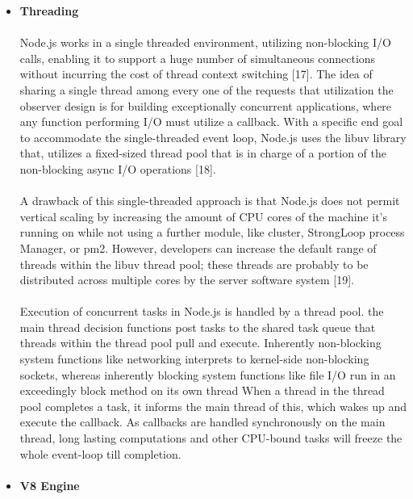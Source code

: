 \documentclass[../thesis.tex]{subfiles}
\begin{document}
\begin{itemize}
    \item \textbf{Threading}
    \paragraph{}
    Node.js works in a single threaded environment, utilizing non-blocking I/O calls, enabling it to support a huge number of simultaneous connections without incurring the cost of thread context switching [17]. The idea of sharing a single thread among every one of the requests that utilization the observer design is for building exceptionally concurrent applications, where any function performing I/O must utilize a callback. With a specific end goal to accommodate the single-threaded event loop, Node.js uses the libuv library that, utilizes a fixed-sized thread pool that is in charge of a portion of the non-blocking async I/O operations [18].
    \paragraph{}
    A drawback of this single-threaded approach is that Node.js does not permit vertical scaling by increasing the amount of CPU cores of the machine it's running on while not using a further module, like cluster, StrongLoop process Manager, or pm2. However, developers can increase the default range of threads within the libuv thread pool; these threads are probably to be distributed across multiple cores by the server software system [19].
    \paragraph{}
    Execution of concurrent tasks in Node.js is handled by a thread pool. the main thread decision functions post tasks to the shared task queue that threads within the thread pool pull and execute. Inherently non-blocking system functions like networking interprets to kernel-side non-blocking sockets, whereas inherently blocking system functions like file I/O run in an exceedingly block method on its own thread When a thread in the thread pool completes a task, it informs the main thread of this, which wakes up and execute the callback. As callbacks are handled synchronously on the main thread, long lasting computations and other CPU-bound tasks will freeze the whole event-loop till completion.
    \paragraph{}
    \item \textbf{V8 Engine}

\end{itemize}
\end{document}
